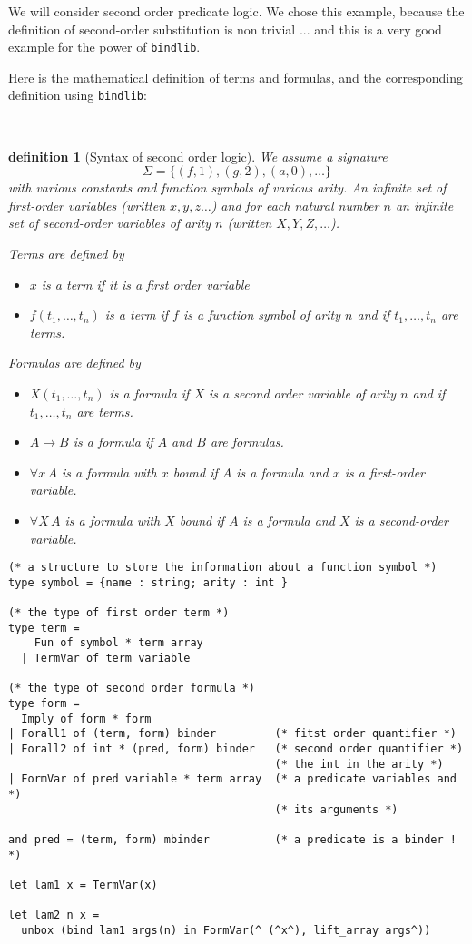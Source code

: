 \documentclass[11pt]{article}
\begin{document}
We will consider second order predicate logic.
We chose this example, because the definition of second-order
substitution is non trivial ... and this is a very good example for
the power of \verb#bindlib#.

Here is the mathematical definition of terms and formulas, and the
corresponding definition using \verb#bindlib#:

\newtheorem{definition}{definition}\
\begin{definition}[Syntax of second order logic]\rm
We assume a signature
$$\Sigma = \{(f,1), (g,2), (a,0), \dots\}$$ with various
constants and function symbols of
various arity. An infinite set of first-order variables (written
$x,y,z\dots$) and for each natural number $n$ an infinite set of
second-order variables of arity $n$ (written $X,Y,Z,\dots$).

Terms are defined by
\begin{itemize}
\item $x$ is a term if it is a first order variable
\item $f(t_1,\dots,t_n)$ is a term if $f$ is a function symbol of
arity $n$ and if $t_1,\dots,t_n$ are terms.
\end{itemize}

Formulas are defined by
\begin{itemize}
\item $X(t_1,\dots,t_n)$ is a formula if $X$ is a second order variable of
arity $n$ and if $t_1,\dots,t_n$ are terms.
\item $A \to B$ is a formula if $A$ and $B$ are formulas.
\item $\forall x\,A$ is a formula with $x$ bound if $A$ is a formula
and $x$ is a first-order variable.
\item $\forall X\,A$ is a formula with $X$ bound if $A$ is a formula
and $X$ is a second-order variable.
\end{itemize}
\end{definition}

\begin{verbatim}
(* a structure to store the information about a function symbol *)
type symbol = {name : string; arity : int }

(* the type of first order term *)
type term =
    Fun of symbol * term array
  | TermVar of term variable

(* the type of second order formula *)
type form =
  Imply of form * form
| Forall1 of (term, form) binder         (* fitst order quantifier *)
| Forall2 of int * (pred, form) binder   (* second order quantifier *)
                                         (* the int in the arity *)
| FormVar of pred variable * term array  (* a predicate variables and *)
                                         (* its arguments *)

and pred = (term, form) mbinder          (* a predicate is a binder ! *)

let lam1 x = TermVar(x)

let lam2 n x =
  unbox (bind lam1 args(n) in FormVar(^ (^x^), lift_array args^))
\end{verbatim}
\end{document}
